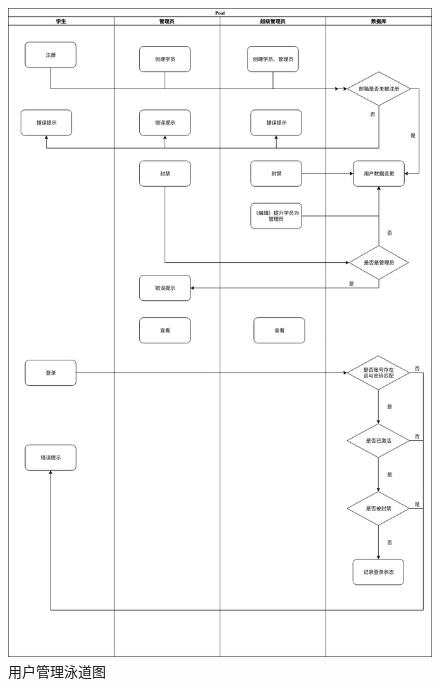 \documentclass{article}
\begin{document}
        \begin{figure}[H]
            \centering
            \includegraphics[width=.8\textwidth]{./UserManageMent.jpg}
            \caption{用户管理泳道图}
        \end{figure}
\end{document}
